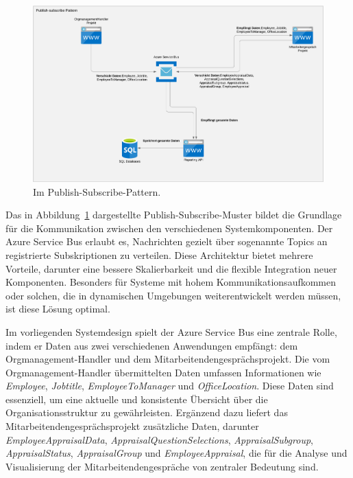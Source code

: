 \begin{figure}[H]
    \centering
    \includegraphics[width=\linewidth, keepaspectratio]{images/Azure (2019) framework - Page 1.png}
    \caption{Im Publish-Subscribe-Pattern.}
    \label{fig:azure_bus_architecture}
\end{figure}


Das in Abbildung~\ref{fig:azure_bus_architecture} dargestellte Publish-Subscribe-Muster bildet die Grundlage für die Kommunikation zwischen den verschiedenen Systemkomponenten. Der Azure Service Bus erlaubt es, Nachrichten gezielt über sogenannte Topics an registrierte Subskriptionen zu verteilen. Diese Architektur bietet mehrere Vorteile, darunter eine bessere Skalierbarkeit und die flexible Integration neuer Komponenten. Besonders für Systeme mit hohem Kommunikationsaufkommen oder solchen, die in dynamischen Umgebungen weiterentwickelt werden müssen, ist diese Lösung optimal.

Im vorliegenden Systemdesign spielt der Azure Service Bus eine zentrale Rolle, indem er Daten aus zwei verschiedenen Anwendungen empfängt: dem Orgmanagement-Handler und dem Mitarbeitendengesprächsprojekt. Die vom Orgmanagement-Handler übermittelten Daten umfassen Informationen wie \textit{Employee}, \textit{Jobtitle}, \textit{EmployeeToManager} und \textit{OfficeLocation}. Diese Daten sind essenziell, um eine aktuelle und konsistente Übersicht über die Organisationsstruktur zu gewährleisten. Ergänzend dazu liefert das Mitarbeitendengesprächsprojekt zusätzliche Daten, darunter \textit{EmployeeAppraisalData}, \textit{AppraisalQuestionSelections}, \textit{AppraisalSubgroup}, \textit{AppraisalStatus}, \textit{AppraisalGroup} und \textit{EmployeeAppraisal}, die für die Analyse und Visualisierung der Mitarbeitendengespräche von zentraler Bedeutung sind.


